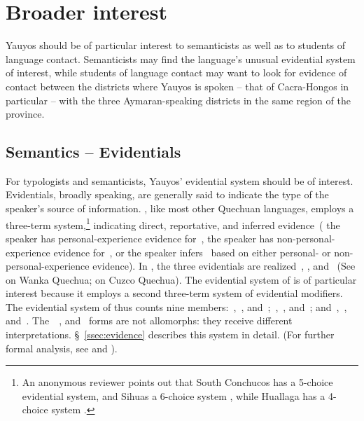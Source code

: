 \section{Broader interest}\label{sec:brin}
Yauyos should be of particular interest to semanticists as well as to students of language contact. Semanticists may find the language's unusual evidential system of interest, while students of language contact may want to look for evidence of contact between the districts where Yauyos is spoken -- that of Cacra-Hongos in particular -- with the three Aymaran-speaking districts in the same region of the province.

\subsection{Semantics -- Evidentials}
For typologists and semanticists, Yauyos' evidential system should be of interest. Evidentials, broadly speaking, are generally said to indicate the type of the speaker's source of information. \SYQ{}, like most other Quechuan languages, employs a three-term system,\footnote{An anonymous reviewer points out that South Conchucos has a 5-choice evidential system, and Sihuas a 6-choice system \citep{Hintz14}, while Huallaga has a 4-choice system \citep{Weber89}.} indicating direct, reportative, and inferred evidence~(\ie{} the speaker has personal-experience evidence for~, the speaker has non-personal-experience evidence for~, or the speaker infers~ based on either personal- or non-personal-experience evidence). In \SYQ{}, the three evidentials are realized~, , and~ (See \citet{Floyd99} on Wanka Quechua; \citet{Faller03} on Cuzco Quechua). The evidential system of \SYQ{} is of particular interest because it employs a second three-term system of evidential modifiers. The evidential system of \SYQ{} thus counts nine members:~,~, and~;~,~, and~; and~,~, and~. The~~, and~ forms are not allomorphs: they receive different interpretations. \S~\ref{ssec:evidence} describes this system in detail. (For further formal analysis, see \citealt{Shimelman12} and \citealt{Shimelman14}).


